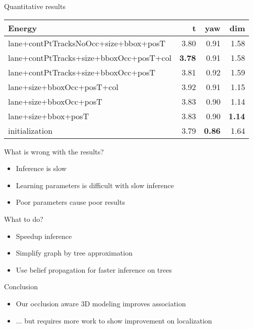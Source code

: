\begin{frame}{Quantitative results}
  \small{
\begin{table}
  \begin{tabular}{lrrr}
    \toprule
    Energy & t & yaw & dim \\
    \midrule
    lane+contPtTracksNoOcc+size+bbox+posT   & 3.80 & 0.91 & 1.58 \\
    lane+contPtTracks+size+bboxOcc+posT+col & \textbf{3.78} & 0.91 & 1.58 \\
    lane+contPtTracks+size+bboxOcc+posT     & 3.81 & 0.92 & 1.59 \\
    lane+size+bboxOcc+posT+col              & 3.92 & 0.91 & 1.15 \\
    lane+size+bboxOcc+posT                  & 3.83 & 0.90 & 1.14 \\
    lane+size+bbox+posT                     & 3.83 & 0.90 & \textbf{1.14} \\
    initialization                          & 3.79 & \textbf{0.86} & 1.64 \\
    \bottomrule
  \end{tabular}
\end{table}
  }

\end{frame}

\begin{frame}{What is wrong with the results?}
  \begin{itemize}
    \item Inference is slow
    \item Learning parameters is difficult with slow inference
    \item Poor parameters cause poor results
  \end{itemize}
\end{frame}
\begin{frame}{What to do?}
  \begin{itemize}
    \item Speedup inference
    \item Simplify graph by \cite{chow1968approximating} tree approximation
    \item Use belief propagation for faster inference on trees
  \end{itemize}
  
\end{frame}

\begin{frame}{Conclusion}
  \begin{itemize}
    \item Our occlusion aware 3D modeling improves association
    \item ... but requires more work to show improvement on localization
  \end{itemize}
  
\end{frame}
